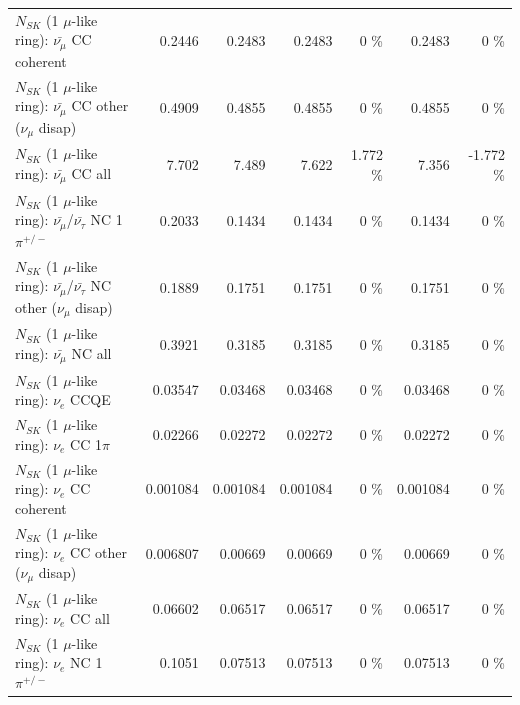\begin{table}
\begin{tabular}{| l | r | r | r  r | r  r |}
                       $N_{SK}$ (1 $\mu$-like ring): $\bar{\nu_\mu}$ CC coherent &          0.2446 &          0.2483 &          0.2483 &        0 \%  &          0.2483 &        0 \%  \\ 
        $N_{SK}$ (1 $\mu$-like ring): $\bar{\nu_\mu}$ CC other ($\nu_\mu$ disap) &          0.4909 &          0.4855 &          0.4855 &        0 \%  &          0.4855 &        0 \%  \\ 
                          $N_{SK}$ (1 $\mu$-like ring): $\bar{\nu_{\mu}}$ CC all &           7.702 &           7.489 &           7.622 &    1.772 \%  &           7.356 &   -1.772 \%  \\ 
\hline
  $N_{SK}$ (1 $\mu$-like ring): $\bar{\nu_\mu}$/$\bar{\nu_\tau}$ NC 1$\pi^{+/-}$ &          0.2033 &          0.1434 &          0.1434 &        0 \%  &          0.1434 &        0 \%  \\ 
$N_{SK}$ (1 $\mu$-like ring): $\bar{\nu_\mu}$/$\bar{\nu_\tau}$ NC other ($\nu_\mu$ disap) &          0.1889 &          0.1751 &          0.1751 &        0 \%  &          0.1751 &        0 \%  \\ 
                          $N_{SK}$ (1 $\mu$-like ring): $\bar{\nu_{\mu}}$ NC all &          0.3921 &          0.3185 &          0.3185 &        0 \%  &          0.3185 &        0 \%  \\ 
\hline
\hline
\hline
                                      $N_{SK}$ (1 $\mu$-like ring): $\nu_e$ CCQE &         0.03547 &         0.03468 &         0.03468 &        0 \%  &         0.03468 &        0 \%  \\ 
                                 $N_{SK}$ (1 $\mu$-like ring): $\nu_e$ CC 1$\pi$ &         0.02266 &         0.02272 &         0.02272 &        0 \%  &         0.02272 &        0 \%  \\ 
                               $N_{SK}$ (1 $\mu$-like ring): $\nu_e$ CC coherent &        0.001084 &        0.001084 &        0.001084 &        0 \%  &        0.001084 &        0 \%  \\ 
                $N_{SK}$ (1 $\mu$-like ring): $\nu_e$ CC other ($\nu_\mu$ disap) &        0.006807 &         0.00669 &         0.00669 &        0 \%  &         0.00669 &        0 \%  \\ 
                                  $N_{SK}$ (1 $\mu$-like ring): $\nu_{e}$ CC all &         0.06602 &         0.06517 &         0.06517 &        0 \%  &         0.06517 &        0 \%  \\ 
\hline
                           $N_{SK}$ (1 $\mu$-like ring): $\nu_e$ NC 1$\pi^{+/-}$ &          0.1051 &         0.07513 &         0.07513 &        0 \%  &         0.07513 &        0 \%  \\ 

\end{tabular}
\end{table}
